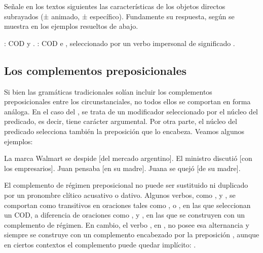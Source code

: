 \begin{ejercicio}\label{ej:07-mdo}
Señale en los textos siguientes las características de los objetos directos
subrayados (± animado, ± específico). Fundamente su respuesta, según se muestra
en los ejemplos resueltos de abajo.


\begin{resuelto}
: COD  y .
: COD  e , seleccionado
por un verbo impersonal de significado .
\end{resuelto}
\end{ejercicio}

\subsection{Los complementos preposicionales}\label{sec:07-regimen}

Si bien las gramáticas tradicionales solían incluir los complementos
preposicionales entre los circunstanciales, no todos ellos se comportan en
forma análoga. En el caso del , se trata de un
modificador seleccionado por el núcleo del predicado, es decir, tiene carácter
argumental. Por otra parte, el núcleo del predicado selecciona también la
preposición que lo encabeza. Veamos algunos ejemplos:

\begin{exe}
  \ex\label{ex:07-walmart} La marca Walmart se despide [del mercado argentino].
  \ex\label{ex:07-discutio} El ministro discutió [con los empresarios].
  \ex\label{ex:07-penso} Juan pensaba [en su madre].
  \ex\label{ex:07-quejo} Juana se quejó [de su madre].
\end{exe}

El complemento de régimen preposicional no puede ser sustituido ni duplicado por
un pronombre clítico acusativo o dativo. Algunos verbos, como ,
 y , se comportan como transitivos en oraciones
tales como ,  o , en las que
seleccionan un COD, a diferencia de oraciones como ,
 y , en las que se construyen con un
complemento de régimen. En cambio, el verbo , en
, no posee esa alternancia y siempre se construye con un
complemento encabezado por la preposición , aunque en ciertos
contextos el complemento puede quedar implícito: .

